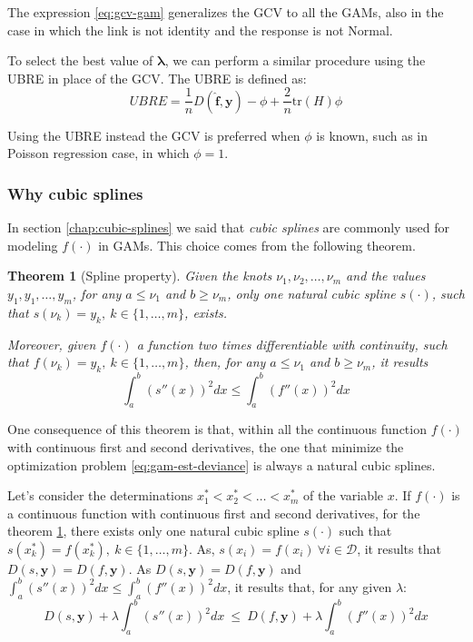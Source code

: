 \documentclass[a4paper, nobind]{templates/ociamthesis}
\newtheorem{theorem}{Theorem}[chapter]
\theoremstyle{definition}
\theoremstyle{definition}
\theoremstyle{definition}
\theoremstyle{remark}
\begin{document}
The expression \eqref{eq:gcv-gam} generalizes the GCV to all the GAMs, also in the case in which the link is not identity and the response is not Normal.

To select the best value of \(\boldsymbol{\lambda}\), we can perform a similar procedure using the UBRE in place of the GCV. The UBRE is defined as:
\[
UBRE = \frac{1}{n} D(\boldsymbol{\hat{f}}, \boldsymbol{y}) - \phi + \frac{2}{n} \text{tr}(H)\phi 
\]

Using the UBRE instead the GCV is preferred when \(\phi\) is known, such as in Poisson regression case, in which \(\phi=1\).

\hypertarget{why-cubic-splines}{%
\subsubsection{Why cubic splines}\label{why-cubic-splines}}

In section \ref{chap:cubic-splines} we said that \emph{cubic splines} are commonly used for modeling \(f(\cdot)\) in GAMs. This choice comes from the following theorem.

\begin{theorem}[Spline property]
\label{thm:th-splines-property} \iffalse (Spline property) \fi{} Given the knots \(\nu_1, \nu_2, \dots, \nu_m\) and the values \(y_1, y_1, \dots, y_m\), for any \(a\le\nu_1\) and \(b\ge\nu_m\), only one natural cubic spline \(s(\cdot)\), such that \(s(\nu_k)=y_k, \ k\in \{1, \dots, m\}\), exists.

Moreover, given \(f(\cdot)\) a function two times differentiable with continuity, such that \(f(\nu_k)=y_k, \ k\in \{1, \dots, m\}\), then, for any \(a\le\nu_1\) and \(b\ge\nu_m\), it results
\[
\int_a^b{\left( s''(x)\right)^2 dx} \le \int_a^b{\left( f''(x)\right)^2 dx}
\]
\end{theorem}
One consequence of this theorem is that, within all the continuous function \(f(\cdot)\) with continuous first and second derivatives, the one that minimize the optimization problem \eqref{eq:gam-est-deviance} is always a natural cubic splines.

Let's consider the determinations \(x_1^* < x_2^* < \dots < x_m^*\) of the variable \(x\). If \(f(\cdot)\) is a continuous function with continuous first and second derivatives, for the theorem \ref{thm:th-splines-property}, there exists only one natural cubic spline \(s(\cdot)\) such that \(s(x_k^*) = f(x_k^*), \ k\in \{1, \dots, m\}\). As, \(s(x_i)=f(x_i) \ \forall i \in \mathcal{D}\), it results that \(D(s, \boldsymbol{y}) = D(f, \boldsymbol{y})\). As \(D(s, \boldsymbol{y}) = D(f, \boldsymbol{y})\) and \(\int_a^b{\left( s''(x)\right)^2 dx} \le \int_a^b{\left( f''(x)\right)^2 dx}\), it results that, for any given \(\lambda\):
\[
D(s, \boldsymbol{y}) + \lambda \int_{a}^{b}{\left( s''(x) \right)^2 dx}
\ \le \ 
D(f, \boldsymbol{y}) + \lambda \int_{a}^{b}{\left( f''(x) \right)^2 dx}
\]
\end{document}
